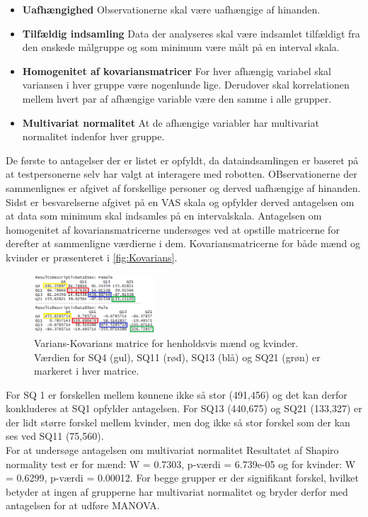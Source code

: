 \begin{itemize}
	\item \textbf{Uafhængighed} Observationerne skal være uafhængige af hinanden. 
	\item \textbf{Tilfældig indsamling} Data der analyseres skal være indsamlet tilfældigt fra den ønskede målgruppe og som minimum være målt på en interval skala. 
	\item \textbf{Homogenitet af kovariansmatricer} For hver afhængig variabel skal variansen i hver gruppe være nogenlunde lige. Derudover skal korrelationen mellem hvert par af afhængige variable være den samme i alle grupper. 
	\item \textbf{Multivariat normalitet} At de afhængige variabler har multivariat normalitet indenfor hver gruppe. 
\end{itemize}
%
De første to antagelser der er listet er opfyldt, da dataindsamlingen er baseret på at testpersonerne selv har valgt at interagere med robotten. OBservationerne der sammenlignes er afgivet af forskellige personer og derved uafhængige af hinanden. Sidst er besvarelserne afgivet på en VAS skala og opfylder derved antagelsen om at data som minimum skal indsamles på en intervalskala. \blankline
% 
Antagelsen om homogenitet af kovariansmatricerne undersøges ved at opstille matricerne for derefter at sammenligne værdierne i dem. Kovariansmatricerne for både mænd og kvinder er præsenteret i \autoref{fig:Kovarians}.
%
\begin{figure}[H]
\centering
\includegraphics[width = 0.4\textwidth]{Figure/DatabehandlingSkalaer/Normality} 
\caption{Varians-Kovarians matrice for henholdsvis mænd og kvinder. Værdien for SQ4 (gul), SQ11 (rød), SQ13 (blå) og SQ21 (grøn) er markeret i hver matrice.}
\label{fig:Kovarians}
\end{figure}
\noindent
%
For SQ 1 er forskellen mellem kønnene ikke så stor (491,456) og det kan derfor konkluderes at SQ1 opfylder antagelsen. For SQ13 (440,675) og SQ21 (133,327) er der lidt større forskel mellem kvinder, men dog ikke så stor forskel som der kan ses ved SQ11 (75,560). \\

%
For at undersøge antagelsen om multivariat normalitet \blankline
%
Resultatet af Shapiro normality test er for mænd: W = 0.7303, p-værdi = 6.739e-05 og for kvinder: W = 0.6299, p-værdi = 0.00012. For begge grupper er der signifikant forskel, hvilket betyder at ingen af grupperne har multivariat normalitet og bryder derfor med antagelsen for at udføre MANOVA. 

